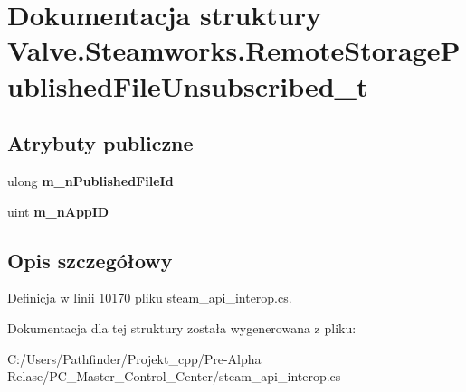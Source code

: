 \hypertarget{struct_valve_1_1_steamworks_1_1_remote_storage_published_file_unsubscribed__t}{}\section{Dokumentacja struktury Valve.\+Steamworks.\+Remote\+Storage\+Published\+File\+Unsubscribed\+\_\+t}
\label{struct_valve_1_1_steamworks_1_1_remote_storage_published_file_unsubscribed__t}
\subsection*{Atrybuty publiczne}
\begin{DoxyCompactItemize}
\item 
\mbox{\label{struct_valve_1_1_steamworks_1_1_remote_storage_published_file_unsubscribed__t_a62190ecd8bf6f381724a7acdc0097ad7}} 
ulong {\bfseries m\+\_\+n\+Published\+File\+Id}
\item 
\mbox{\label{struct_valve_1_1_steamworks_1_1_remote_storage_published_file_unsubscribed__t_a8e53d620ee6b0e1865796fae4af45e62}} 
uint {\bfseries m\+\_\+n\+App\+ID}
\end{DoxyCompactItemize}


\subsection{Opis szczegółowy}


Definicja w linii 10170 pliku steam\+\_\+api\+\_\+interop.\+cs.



Dokumentacja dla tej struktury została wygenerowana z pliku\+:\begin{DoxyCompactItemize}
\item 
C\+:/\+Users/\+Pathfinder/\+Projekt\+\_\+cpp/\+Pre-\/\+Alpha Relase/\+P\+C\+\_\+\+Master\+\_\+\+Control\+\_\+\+Center/steam\+\_\+api\+\_\+interop.\+cs\end{DoxyCompactItemize}
